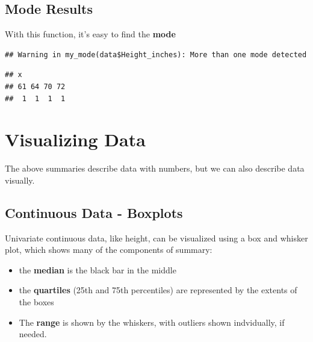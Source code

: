 \documentclass[
]{book}
\newenvironment{Shaded}{\begin{snugshade}}{\end{snugshade}}
\newcommand{\FunctionTok}[1]{\textcolor[rgb]{0.00,0.00,0.00}{#1}}
\newcommand{\NormalTok}[1]{#1}
\newcommand{\SpecialCharTok}[1]{\textcolor[rgb]{0.00,0.00,0.00}{#1}}
\providecommand{\tightlist}{%
  \setlength{\itemsep}{0pt}\setlength{\parskip}{0pt}}
\begin{document}
\hypertarget{mode-results}{%
\subsection*{Mode Results}\label{mode-results}}

With this function, it's easy to find the \textbf{mode}

\begin{Shaded}
\end{Shaded}

\begin{verbatim}
## Warning in my_mode(data$Height_inches): More than one mode detected
\end{verbatim}

\begin{verbatim}
## x
## 61 64 70 72 
##  1  1  1  1
\end{verbatim}

\hypertarget{visualizing-data}{%
\section*{Visualizing Data}\label{visualizing-data}}

The above summaries describe data with numbers, but we can also describe data visually.

\hypertarget{continuous-data---boxplots}{%
\subsection*{Continuous Data - Boxplots}\label{continuous-data---boxplots}}

Univariate continuous data, like height, can be visualized using a box and whisker plot, which shows many of the components of summary:

\begin{itemize}
\tightlist
\item
  the \textbf{median} is the black bar in the middle
\item
  the \textbf{quartiles} (25th and 75th percentiles) are represented by the extents of the boxes
\item
  The \textbf{range} is shown by the whiskers, with outliers shown indvidually, if needed.
\end{itemize}
\end{document}
